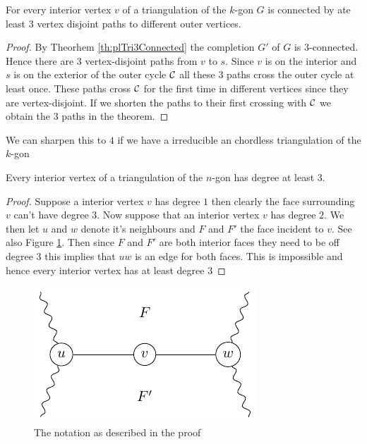 \begin{thrm}
For every interior vertex $v$ of a triangulation of the $k$-gon $G$ is connected by ate least $3$ vertex disjoint paths to different outer vertices.
\end{thrm}
\begin{proof}
By Theorhem \ref{th:plTri3Connected} the completion $G'$ of $G$ is $3$-connected. Hence there are 3 vertex-disjoint paths from $v$ to $s$. Since $v$ is on the interior and $s$ is on the exterior of the outer cycle $\mathcal{C}$ all these 3 paths cross the outer cycle at least once. These paths cross $\mathcal{C}$ for the first time in different vertices since they are vertex-disjoint. If we shorten the paths to their first crossing with $\mathcal{C}$ we obtain the $3$ paths in the theorem.
\end{proof}

\note We can sharpen this to $4$ if we have a irreducible an chordless triangulation of the $k$-gon

\begin{thrm}
Every interior vertex of a triangulation of the $n$-gon has degree at least $3$.
\end{thrm}
\begin{proof}
Suppose a interior vertex $v$ has degree $1$ then clearly the face surrounding $v$ can't have degree $3$. Now suppose that an interior vertex $v$ has degree $2$. We then let $u$ and $w$ denote it's neighbours and $F$ and $F'$ the face incident to $v$. See also Figure \ref{fig:interiorVertexDegree3}. Then since $F$ and $F'$ are both interior faces they need to be off degree $3$ this implies that $uw$ is an edge for both faces. This is impossible and hence every interior vertex has at least degree $3$
\end{proof}

\begin{figure}[h!]
\centering
\includegraphics{prelim/img/interiorVertexDegree3.pdf}
\caption{The notation as described in the proof \label{fig:interiorVertexDegree3}
}
\end{figure}

